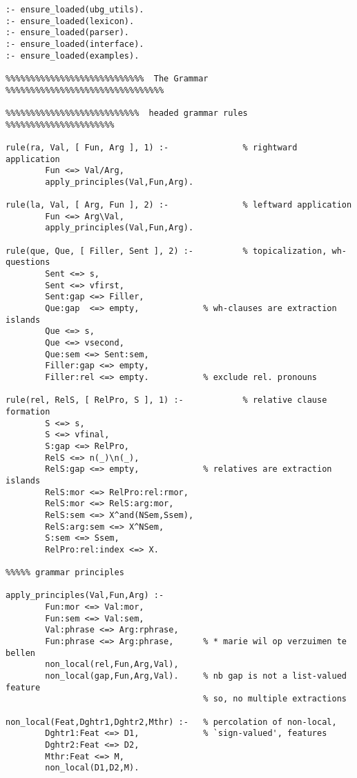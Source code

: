 \begin{verbatim}
:- ensure_loaded(ubg_utils).
:- ensure_loaded(lexicon).
:- ensure_loaded(parser).
:- ensure_loaded(interface).
:- ensure_loaded(examples).

%%%%%%%%%%%%%%%%%%%%%%%%%%%%  The Grammar %%%%%%%%%%%%%%%%%%%%%%%%%%%%%%%%

%%%%%%%%%%%%%%%%%%%%%%%%%%%  headed grammar rules   %%%%%%%%%%%%%%%%%%%%%%
        
rule(ra, Val, [ Fun, Arg ], 1) :-               % rightward application
        Fun <=> Val/Arg,
        apply_principles(Val,Fun,Arg).
        
rule(la, Val, [ Arg, Fun ], 2) :-               % leftward application
        Fun <=> Arg\Val,
        apply_principles(Val,Fun,Arg).
        
rule(que, Que, [ Filler, Sent ], 2) :-          % topicalization, wh-questions
        Sent <=> s,
        Sent <=> vfirst,
        Sent:gap <=> Filler,            
        Que:gap  <=> empty,             % wh-clauses are extraction islands
        Que <=> s,
        Que <=> vsecond,
        Que:sem <=> Sent:sem,
        Filler:gap <=> empty,
        Filler:rel <=> empty.           % exclude rel. pronouns
        
rule(rel, RelS, [ RelPro, S ], 1) :-            % relative clause formation
        S <=> s,
        S <=> vfinal,
        S:gap <=> RelPro,
        RelS <=> n(_)\n(_),             
        RelS:gap <=> empty,             % relatives are extraction islands
        RelS:mor <=> RelPro:rel:rmor,   
        RelS:mor <=> RelS:arg:mor,
        RelS:sem <=> X^and(NSem,Ssem),
        RelS:arg:sem <=> X^NSem,
        S:sem <=> Ssem,
        RelPro:rel:index <=> X.
        
%%%%% grammar principles

apply_principles(Val,Fun,Arg) :-
        Fun:mor <=> Val:mor,
        Fun:sem <=> Val:sem,
        Val:phrase <=> Arg:rphrase,     
        Fun:phrase <=> Arg:phrase,      % * marie wil op verzuimen te bellen
        non_local(rel,Fun,Arg,Val),
        non_local(gap,Fun,Arg,Val).     % nb gap is not a list-valued feature
                                        % so, no multiple extractions
                                        
non_local(Feat,Dghtr1,Dghtr2,Mthr) :-   % percolation of non-local,
        Dghtr1:Feat <=> D1,             % `sign-valued', features
        Dghtr2:Feat <=> D2,
        Mthr:Feat <=> M,
        non_local(D1,D2,M).
        

\end{verbatim}
